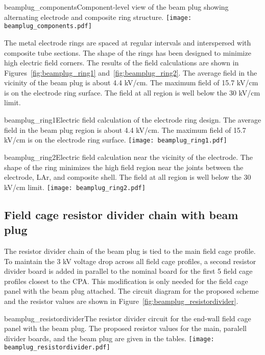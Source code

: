 \begin{cdrfigure}{beamplug_components}{Component-level view of the beam plug showing alternating electrode and composite ring structure.}
  \texttt{[image: beamplug\_components.pdf]}
\end{cdrfigure}

The metal electrode rings are spaced at regular intervals and interspersed with composite tube sections. The shape of the rings has been designed to minimize high electric field corners. The results of the field calculations are shown in Figures~\ref{fig:beamplug_ring1} and~\ref{fig:beamplug_ring2}. The average field in the vicinity of the beam plug is about 4.4 kV/cm. The maximum field of 15.7 kV/cm is on the electrode ring surface. The field at all region is well below the 30 kV/cm limit.

\begin{cdrfigure}{beamplug_ring1}{Electric field calculation of the electrode ring design. The average field in the beam plug region is about 4.4 kV/cm. The maximum field of 15.7 kV/cm is on the electrode ring surface. }
  \texttt{[image: beamplug\_ring1.pdf]}
\end{cdrfigure}

\begin{cdrfigure}{beamplug_ring2}{Electric field calculation near the vicinity of the electrode. The shape of the ring minimizes the high field region near the joints between the electrode, LAr, and composite shell. The field at all region is well below the 30 kV/cm limit.}
  \texttt{[image: beamplug\_ring2.pdf]}
\end{cdrfigure}

\subsection{Field cage resistor divider chain with beam plug}
The resistor divider chain of the beam plug is tied to the main field cage profile. To maintain the 3 kV voltage drop across all field cage profiles, a second resistor divider board is added in parallel to the nominal board for the first 5 field cage profiles closest to the CPA. This modification is only needed for the field cage panel with the beam plug attached. The circuit diagram for the proposed scheme and the resistor values are shown in Figure~\ref{fig:beamplug_resistordivider}.
\begin{cdrfigure}{beamplug_resistordivider}{The resistor divider circuit for the end-wall field cage panel with the beam plug. The proposed resistor values for the main, paralell divider boards, and the beam plug are given in the tables.}
  \texttt{[image: beamplug\_resistordivider.pdf]}
\end{cdrfigure}

